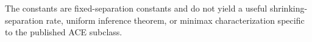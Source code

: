 The constants are fixed-separation constants and do not yield a useful shrinking-separation rate, uniform inference theorem, or minimax characterization specific to the published ACE subclass.